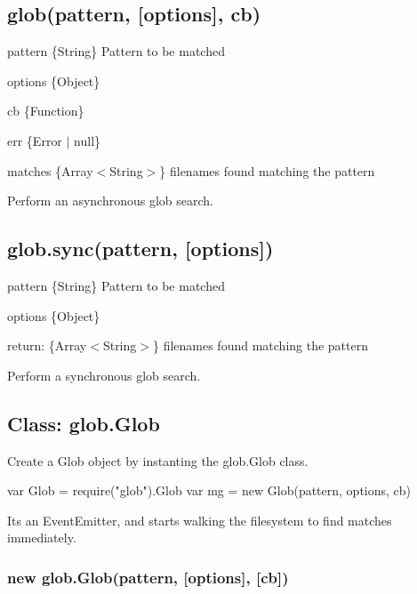 \subsection*{glob(pattern, \mbox{[}options\mbox{]}, cb)}


\begin{DoxyItemize}
\item {\ttfamily pattern} \{String\} Pattern to be matched
\item {\ttfamily options} \{Object\}
\item {\ttfamily cb} \{Function\}
\begin{DoxyItemize}
\item {\ttfamily err} \{Error $\vert$ null\}
\item {\ttfamily matches} \{Array$<$\+String$>$\} filenames found matching the pattern
\end{DoxyItemize}
\end{DoxyItemize}

Perform an asynchronous glob search.

\subsection*{glob.\+sync(pattern, \mbox{[}options\mbox{]})}


\begin{DoxyItemize}
\item {\ttfamily pattern} \{String\} Pattern to be matched
\item {\ttfamily options} \{Object\}
\item return\+: \{Array$<$\+String$>$\} filenames found matching the pattern
\end{DoxyItemize}

Perform a synchronous glob search.

\subsection*{Class\+: glob.\+Glob}

Create a Glob object by instanting the {\ttfamily glob.\+Glob} class.


\begin{DoxyCode}
var Glob = require("glob").Glob
var mg = new Glob(pattern, options, cb)
\end{DoxyCode}


It\textquotesingle{}s an Event\+Emitter, and starts walking the filesystem to find matches immediately.

\subsubsection*{new glob.\+Glob(pattern, \mbox{[}options\mbox{]}, \mbox{[}cb\mbox{]})}


